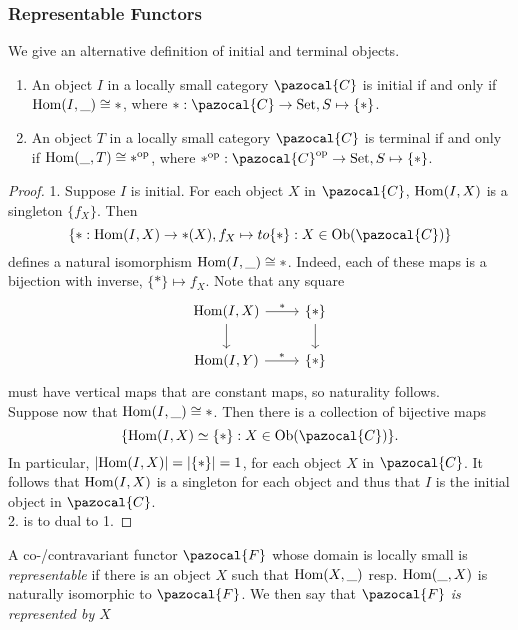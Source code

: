 \subsubsection{Representable Functors}
We give an alternative definition of initial and terminal objects.
\begin{lemma}
    \begin{enumerate}
        \item An object $I$ in a locally small category $\pazocal{C}$ is initial if and only if $\mathrm{Hom}(I,\_)\cong \ast$, where $\ast : \pazocal{C}\rightarrow \mathrm{Set}, S\mapsto \{\ast\}$. 
        \item An object $T$ in a locally small category $\pazocal{C}$ is terminal if and only if $\mathrm{Hom}(\_,T)\cong \ast^\mathrm{op}$, where $\ast\op : \pazocal{C}\op\rightarrow \mathrm{Set}, S\mapsto \{\ast\}$. 
    \end{enumerate}
\end{lemma}
\begin{proof}
    1. Suppose $I$ is initial. For each object $X$ in $\pazocal{C}$, $\mathrm{Hom}(I,X)$ is a singleton $\{f_X\}$. Then 
    $$
        \{ \ast:\Hom(I,X) \rightarrow \ast(X), f_X\mapsto to \{\ast\} : X\in \Ob(\pazocal{C})\}
    $$
    defines a natural isomorphism $\mathrm{Hom}(I,\_)\cong \ast$. Indeed, each of these maps is a bijection with inverse, $\{\ast\}\mapsto f_X$. Note that any square
    $$
        \begin{tikzcd}
            \Hom(I,X) \arrow[r,"\ast"] \arrow[d] & \{\ast\} \arrow[d] \\
            \Hom(I,Y) \arrow[r,"\ast"] &\{\ast\} 
        \end{tikzcd}
    $$
    must have vertical maps that are constant maps, so naturality follows.\\
    Suppose now that $\mathrm{Hom}(I,\_)\cong \ast$. Then there is a collection of bijective maps 
    $$
        \{\Hom(I,X) \simeq \{\ast\} : X\in \Ob(\pazocal{C})\}.
    $$
    In particular, $\vert \mathrm{Hom}(I,X) \vert  =\vert \{\ast\}\vert = 1$, for each object $X$ in $\pazocal{C}$. It follows that $\mathrm{Hom}(I,X)$ is a singleton for each object and thus that $I$ is the initial object in $\pazocal{C}$.\\
    2. is to dual to 1.
\end{proof}
\begin{definition}
    A co-/contravariant functor $\pazocal{F}$ whose domain is locally small is \emph{representable} if there is an object $X$ such that $\mathrm{Hom}(X,\_)$ resp. $\mathrm{Hom}(\_,X)$ is naturally isomorphic to $\pazocal{F}$. We then say that \emph{$\pazocal{F}$ is represented by $X$}
\end{definition}

